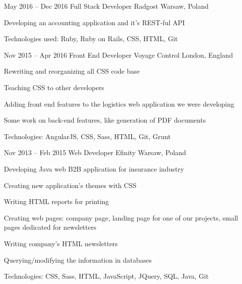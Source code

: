 \begin{sectionlist}
    \sectionlistitemjob
        {May 2016 -- Dec 2016}
        {Full Stack Developer}
        {Radgost}
        {Warsaw, Poland}
        {
            \begin{joblisting}
                \item Developing an accounting application and it's REST-ful
                    API
                \item Technologies used: Ruby, Ruby on Rails, CSS, HTML, Git
            \end{joblisting}
        }

    \sectionlistitemjob
        {Nov 2015 -- Apr 2016}
        {Front End Developer}
        {Voyage Control}
        {London, England}
        {
            \begin{joblisting}
                \item Rewriting and reorganizing all CSS code base
                \item Teaching CSS to other developers
                \item Adding front end features to the logistics web
                    application we were developing
                \item Some work on back-end features, like generation of PDF
                    documents
                \item Technologies: AngularJS, CSS, Sass, HTML, Git, Grunt
            \end{joblisting}
        }

    \sectionlistitemjob
        {Nov 2013 -- Feb 2015}
        {Web Developer}
        {Efinity}
        {Warsaw, Poland}
        {
            \begin{joblisting}
                \item Developing Java web B2B application for insurance
                    industry
                \item Creating new application's themes with CSS
                \item Writing HTML reports for printing
                \item Creating web pages: company page, landing page for one
                    of our projects, small pages dedicated for newsletters
                \item Writing company's HTML newsletters
                \item Querying/modifying the information in databases
                \item Technologies: CSS, Sass, HTML, JavaScript, JQuery,
                    SQL, Java, Git
            \end{joblisting}
        }

\end{sectionlist}
